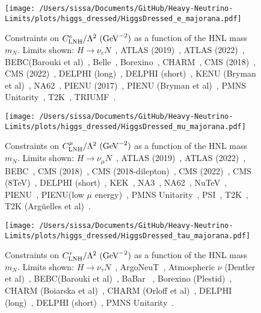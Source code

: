 \documentclass{revtex4-1}%
\begin{document}
%
\normalsize%


\begin{figure}[h!]%
\centering%
\texttt{[image: /Users/sissa/Documents/GitHub/Heavy-Neutrino-Limits/plots/higgs\_dressed/HiggsDressed\_e\_majorana.pdf]}%
\caption{Constraints on $C^e_\text{LNH}/\Lambda^2 ~(\rm{GeV}^{-2})$ as a function of the HNL mass $m_N$. Limits shown: $H\to \nu_{e}N$~\cite{ParticleDataGroup:2022pth}, ATLAS (2019)~\cite{ATLAS:2019kpx}, ATLAS (2022)~\cite{ATLAS:2022atq}, BEBC(Barouki et al)~\cite{Barouki:2022bkt}, Belle~\cite{Belle:2013ytx}, Borexino~\cite{Borexino:2013bot}, CHARM~\cite{CHARM:1985nku}, CMS (2018)~\cite{CMS:2018iaf}, CMS (2022)~\cite{CMS:2022fut}, DELPHI (long)~\cite{DELPHI:1996qcc}, DELPHI (short)~\cite{DELPHI:1996qcc}, KENU (Bryman et al)~\cite{Bryman:2019bjg}, NA62~\cite{NA62:2020mcv}, PIENU (2017)~\cite{PIENU:2017wbj}, PIENU (Bryman et al)~\cite{Bryman:2019bjg}, PMNS Unitarity~\cite{Workinprogress}, T2K~\cite{T2K:2019jwa}, TRIUMF~\cite{Britton:1992xv}.}%
\end{figure}

%


\begin{figure}[h!]%
\centering%
\texttt{[image: /Users/sissa/Documents/GitHub/Heavy-Neutrino-Limits/plots/higgs\_dressed/HiggsDressed\_mu\_majorana.pdf]}%
\caption{Constraints on $C^\mu_\text{LNH}/\Lambda^2 ~(\rm{GeV}^{-2})$ as a function of the HNL mass $m_N$. Limits shown: $H\to \nu_{\mu}N$~\cite{ParticleDataGroup:2022pth}, ATLAS (2019)~\cite{ATLAS:2019kpx}, ATLAS (2022)~\cite{ATLAS:2022atq}, BEBC~\cite{WA66:1985mfx}, CMS (2018)~\cite{CMS:2018iaf}, CMS (2018-dilepton)~\cite{CMS:2018jxx}, CMS (2022)~\cite{CMS:2022fut}, CMS (8TeV)~\cite{CMS:2016aro}, DELPHI (short)~\cite{DELPHI:1996qcc}, KEK~\cite{Bryman:2019bjg}, NA3~\cite{NA3:1986ahv}, NA62~\cite{NA62:2021bji}, NuTeV~\cite{NuTeV:1999kej}, PIENU~\cite{PIENU:2019usb}, PIENU(low $\mu$ energy)~\cite{PIENU:2019usb}, PMNS Unitarity~\cite{Workinprogress}, PSI~\cite{Daum:1987bg}, T2K~\cite{T2K:2019jwa}, T2K (Arg\"uelles et al)~\cite{Arguelles:2021dqn}.}%
\end{figure}

%


\begin{figure}[h!]%
\centering%
\texttt{[image: /Users/sissa/Documents/GitHub/Heavy-Neutrino-Limits/plots/higgs\_dressed/HiggsDressed\_tau\_majorana.pdf]}%
\caption{Constraints on $C^\tau_\text{LNH}/\Lambda^2 ~(\rm{GeV}^{-2})$ as a function of the HNL mass $m_N$. Limits shown: $H\to \nu_{\tau}N$~\cite{ParticleDataGroup:2022pth}, ArgoNeuT~\cite{ArgoNeuT:2021clc}, Atmospheric $\nu$ (Dentler et al)~\cite{Dentler:2018sju}, BEBC(Barouki et al)~\cite{Barouki:2022bkt}, BaBar ~\cite{BaBar:2022cqj}, Borexino (Plestid)~\cite{Plestid:2020ssy}, CHARM (Boiarska et al)~\cite{Boiarska:2021yho}, CHARM (Orloff et al)~\cite{Orloff:2002de}, DELPHI (long)~\cite{DELPHI:1996qcc}, DELPHI (short)~\cite{DELPHI:1996qcc}, PMNS Unitarity~\cite{Workinprogress}.}%
\end{figure}

%
%
%
\end{document}
